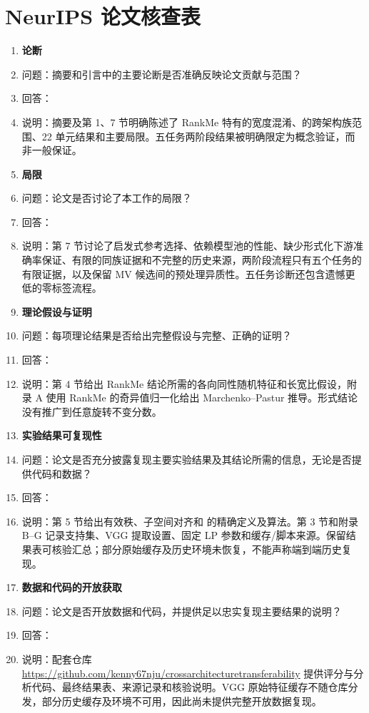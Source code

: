 \section*{NeurIPS 论文核查表}

\begin{enumerate}
\item \textbf{论断}
\item[] 问题：摘要和引言中的主要论断是否准确反映论文贡献与范围？
\item[] 回答：\answerYes{}
\item[] 说明：摘要及第 1、7 节明确陈述了 RankMe 特有的宽度混淆、\SSRdag 的跨架构族范围、22 单元结果和主要局限。五任务两阶段结果被明确限定为概念验证，而非一般保证。

\item \textbf{局限}
\item[] 问题：论文是否讨论了本工作的局限？
\item[] 回答：\answerYes{}
\item[] 说明：第 7 节讨论了启发式参考选择、依赖模型池的性能、缺少形式化下游准确率保证、有限的同族证据和不完整的历史来源，两阶段流程只有五个任务的有限证据，以及保留 MV 候选间的预处理异质性。五任务诊断还包含遗憾更低的零标签流程。

\item \textbf{理论假设与证明}
\item[] 问题：每项理论结果是否给出完整假设与完整、正确的证明？
\item[] 回答：\answerYes{}
\item[] 说明：第 4 节给出 RankMe 结论所需的各向同性随机特征和长宽比假设，附录 A 使用 RankMe 的奇异值归一化给出 Marchenko--Pastur 推导。形式结论没有推广到任意旋转不变分数。

\item \textbf{实验结果可复现性}
\item[] 问题：论文是否充分披露复现主要实验结果及其结论所需的信息，无论是否提供代码和数据？
\item[] 回答：\answerNo{}
\item[] 说明：第 5 节给出有效秩、子空间对齐和 \SSRdag 的精确定义及算法。第 3 节和附录 B--G 记录支持集、VGG 提取设置、固定 LP 参数和缓存/脚本来源。保留结果表可核验汇总；部分原始缓存及历史环境未恢复，不能声称端到端历史复现。
\item \textbf{数据和代码的开放获取}
\item[] 问题：论文是否开放数据和代码，并提供足以忠实复现主要结果的说明？
\item[] 回答：\answerNo{}
\item[] 说明：配套仓库 \url{https://github.com/kenny67nju/crossarchitecturetransferability} 提供评分与分析代码、最终结果表、来源记录和核验说明。VGG 原始特征缓存不随仓库分发，部分历史缓存及环境不可用，因此尚未提供完整开放数据复现。


\end{enumerate}
